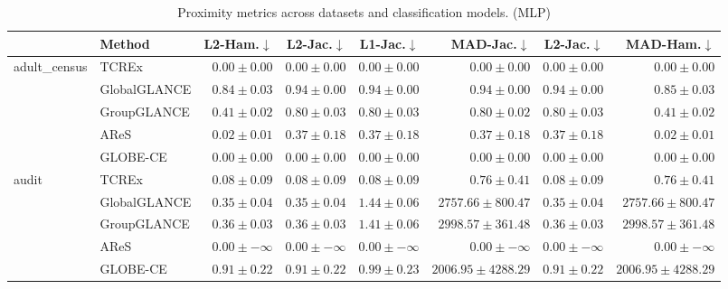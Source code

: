 \begin{table}[ht]
\centering
\caption{Proximity metrics across datasets and classification models. (MLP)}
\label{tab:proximity_metrics_mlpclassifier}
\begin{center}
\begin{sc}
\begin{scriptsize}
\begin{tabular}{l|l|rrrrrr}
\toprule
 & Method & L2-Ham.$\downarrow$ & L2-Jac.$\downarrow$ & L1-Jac.$\downarrow$ & MAD-Jac.$\downarrow$ & L2-Jac.$\downarrow$ & MAD-Ham.$\downarrow$ \\
\midrule
\multirow{5}{*}{adult\_census} & TCREx & $\boldsymbol{0.00\pm{0.00}}$ & $\boldsymbol{0.00\pm{0.00}}$ & $\boldsymbol{0.00\pm{0.00}}$ & $\boldsymbol{0.00\pm{0.00}}$ & $\boldsymbol{0.00\pm{0.00}}$ & $\boldsymbol{0.00\pm{0.00}}$ \\
 & GlobalGLANCE & $0.84\pm{0.03}$ & $0.94\pm{0.00}$ & $0.94\pm{0.00}$ & $0.94\pm{0.00}$ & $0.94\pm{0.00}$ & $0.85\pm{0.03}$ \\
 & GroupGLANCE & $0.41\pm{0.02}$ & $0.80\pm{0.03}$ & $0.80\pm{0.03}$ & $0.80\pm{0.02}$ & $0.80\pm{0.03}$ & $0.41\pm{0.02}$ \\
 & AReS & $0.02\pm{0.01}$ & $0.37\pm{0.18}$ & $0.37\pm{0.18}$ & $0.37\pm{0.18}$ & $0.37\pm{0.18}$ & $0.02\pm{0.01}$ \\
 & GLOBE-CE & $\boldsymbol{0.00\pm{0.00}}$ & $\boldsymbol{0.00\pm{0.00}}$ & $\boldsymbol{0.00\pm{0.00}}$ & $\boldsymbol{0.00\pm{0.00}}$ & $\boldsymbol{0.00\pm{0.00}}$ & $\boldsymbol{0.00\pm{0.00}}$ \\
\midrule
\multirow{5}{*}{audit} & TCREx & $0.08\pm{0.09}$ & $0.08\pm{0.09}$ & $0.08\pm{0.09}$ & $0.76\pm{0.41}$ & $0.08\pm{0.09}$ & $0.76\pm{0.41}$ \\
 & GlobalGLANCE & $0.35\pm{0.04}$ & $0.35\pm{0.04}$ & $1.44\pm{0.06}$ & $2757.66\pm{800.47}$ & $0.35\pm{0.04}$ & $2757.66\pm{800.47}$ \\
 & GroupGLANCE & $0.36\pm{0.03}$ & $0.36\pm{0.03}$ & $1.41\pm{0.06}$ & $2998.57\pm{361.48}$ & $0.36\pm{0.03}$ & $2998.57\pm{361.48}$ \\
 & AReS & $\boldsymbol{0.00\pm{-\infty}}$ & $\boldsymbol{0.00\pm{-\infty}}$ & $\boldsymbol{0.00\pm{-\infty}}$ & $\boldsymbol{0.00\pm{-\infty}}$ & $\boldsymbol{0.00\pm{-\infty}}$ & $\boldsymbol{0.00\pm{-\infty}}$ \\
 & GLOBE-CE & $0.91\pm{0.22}$ & $0.91\pm{0.22}$ & $0.99\pm{0.23}$ & $2006.95\pm{4288.29}$ & $0.91\pm{0.22}$ & $2006.95\pm{4288.29}$ \\

\end{tabular}
\end{scriptsize}
\end{sc}
\end{center}
\end{table}
